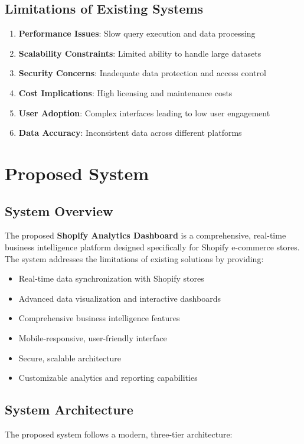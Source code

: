 \documentclass[12pt]{article}
\begin{document}
\subsection{Limitations of Existing Systems}
\begin{enumerate}
    \item \textbf{Performance Issues}: Slow query execution and data processing
    \item \textbf{Scalability Constraints}: Limited ability to handle large datasets
    \item \textbf{Security Concerns}: Inadequate data protection and access control
    \item \textbf{Cost Implications}: High licensing and maintenance costs
    \item \textbf{User Adoption}: Complex interfaces leading to low user engagement
    \item \textbf{Data Accuracy}: Inconsistent data across different platforms
\end{enumerate}

\section{Proposed System}

\subsection{System Overview}
The proposed \textbf{Shopify Analytics Dashboard} is a comprehensive, real-time business intelligence platform designed specifically for Shopify e-commerce stores. The system addresses the limitations of existing solutions by providing:

\begin{itemize}
    \item Real-time data synchronization with Shopify stores
    \item Advanced data visualization and interactive dashboards
    \item Comprehensive business intelligence features
    \item Mobile-responsive, user-friendly interface
    \item Secure, scalable architecture
    \item Customizable analytics and reporting capabilities
\end{itemize}

\subsection{System Architecture}
The proposed system follows a modern, three-tier architecture:
\end{document}
